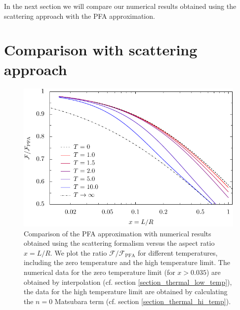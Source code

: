 In the next section we will compare our numerical results obtained using the
scattering approach with the PFA approximation.

\section{Comparison with scattering approach}

\begin{figure}
  \begin{center}
  \includegraphics[scale=1]{plots/pfa/pfa.pdf}
  \end{center}

  \caption{Comparison of the PFA approximation with numerical results
  obtained using the scattering formalism versus the aspect ratio $x=L/R$.
  We plot the ratio $\mathcal{F}/\mathcal{F}_\text{PFA}$ for different temperatures, including the
  zero temperature and the high temperature limit. The numerical data for the
  zero temperature limit (for $x>0.035$) are obtained by interpolation (cf. section \ref{section_thermal_low_temp}), the data
  for the high temperature limit are obtained by calculating the $n=0$ Matsubara
  term (cf. section \ref{section_thermal_hi_temp}).}
  \label{fig:pfa_pfa}
\end{figure}

